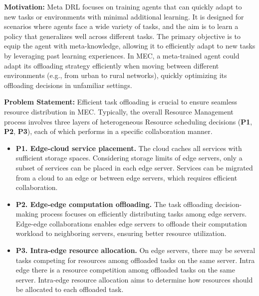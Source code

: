 \documentclass[12pt]{article}
\begin{document}
\noindent\textbf{\large Motivation:  }
\noindent
Meta DRL focuses on training agents that can quickly adapt to new tasks or environments with minimal additional learning. It is designed for scenarios where agents face a wide variety of tasks, and the aim is to learn a policy that generalizes well across different tasks. The primary objective is to equip the agent with meta-knowledge, allowing it to efficiently adapt to new tasks by leveraging past learning experiences. In MEC, a meta-trained agent could adapt its offloading strategy efficiently when moving between different environments (e.g., from urban to rural networks), quickly optimizing its offloading decisions in unfamiliar settings.


\vspace{3mm}
 
 

\noindent\textbf{\large Problem Statement: } Efficient task offloading is crucial to ensure seamless resource distribution in MEC.
Typically, the overall Resource Management process involves three layers of heterogeneous Resource scheduling decisions (\textbf{P1}, \textbf{P2}, \textbf{P3}), each of which performs in a specific collaboration manner. \vspace{-2mm}

\begin{itemize}
	
	\item \textbf{P1. Edge-cloud service placement. } %
	The cloud caches all services with sufficient storage spaces. Considering storage limits of edge servers, only a subset of services can be placed in each edge server. Services can be migrated from a cloud to an edge or between edge servers, which requires efficient collaboration.\vspace{-2mm}
	
	\item\textbf{P2. Edge-edge computation offloading. }  The task offloading decision-making process focuses on efficiently distributing tasks among edge servers. Edge-edge collaborations enables edge servers to offloade their computation workload to neighboring servers, ensuring better resource utilization. \vspace{-2mm}
	
	\item\textbf{P3. Intra-edge resource allocation. } On edge servers, there may be several tasks competing for resources among offloaded tasks on the same server. Intra edge there is a resource competition among offloaded tasks on the same server. Intra-edge resource allocation aims to determine how resources should be allocated to each offloaded task.
	
\end{itemize}
\end{document}
